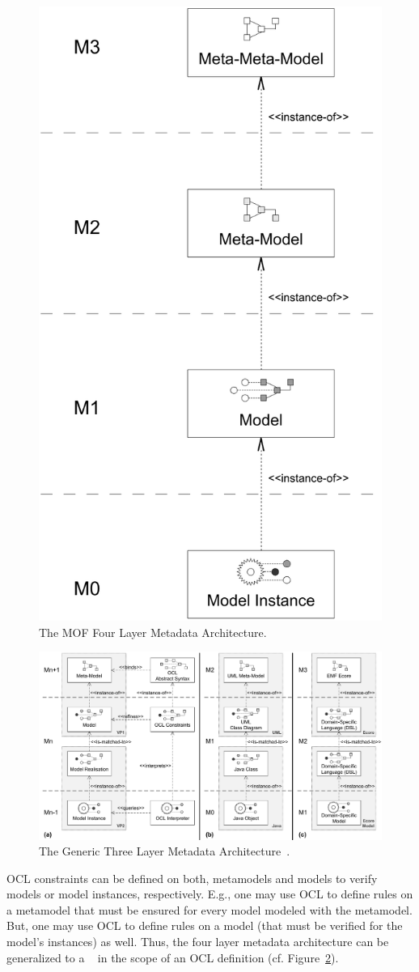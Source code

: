 \begin{figure}[!t]
	\centering
	\includegraphics[width=.4\linewidth]{figures/architecture/mofLayers}
	\caption{The MOF Four Layer Metadata Architecture.}
	\label{pic:architecture:mofLayers}
\end{figure}

\begin{figure}
	\centering
	\includegraphics[width=1.0\linewidth]{figures/architecture/genericLayers}
	\caption{The Generic Three Layer Metadata
	Architecture~\cite{wilkeEA:MODELS2010}.}
	\label{pic:architecture:genericLayers}
\end{figure}

OCL constraints can be defined on both, metamodels and models to verify models
or model instances, respectively. E.g., one may use OCL to define rules on a
metamodel that must be ensured for every model modeled with the metamodel. But,
one may use OCL to define rules on a model (that must be verified for the
model's instances) as well. Thus, the four layer metadata architecture can be
generalized to a ~\cite{demuth:RGWS09} in the scope of an OCL definition (cf.
Figure~\ref{pic:architecture:genericLayers}).

